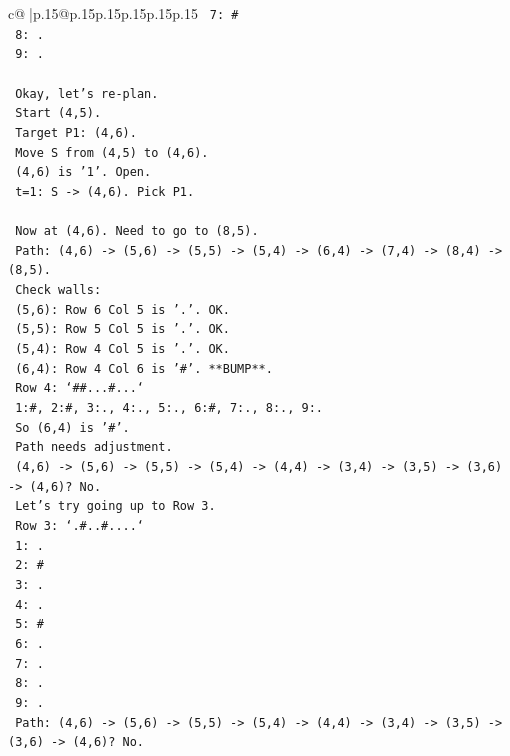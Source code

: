 \documentclass{article}
\begin{document}
{\begin{supertabular}{c@{$\;$}|p{.15\linewidth}@{}p{.15\linewidth}p{.15\linewidth}p{.15\linewidth}p{.15\linewidth}p{.15\linewidth}}
{{{\texttt{   7: \#} \\
\texttt{   8: .} \\
\texttt{   9: .} \\
\\ 
\texttt{   Okay, let's re{-}plan.} \\
\texttt{   Start (4,5).} \\
\texttt{   Target P1: (4,6).} \\
\texttt{   Move S from (4,5) to (4,6).} \\
\texttt{   (4,6) is '1'. Open.} \\
\texttt{   t=1: S {-}> (4,6). Pick P1.} \\
\\ 
\texttt{   Now at (4,6). Need to go to (8,5).} \\
\texttt{   Path: (4,6) {-}> (5,6) {-}> (5,5) {-}> (5,4) {-}> (6,4) {-}> (7,4) {-}> (8,4) {-}> (8,5).} \\
\texttt{   Check walls:} \\
\texttt{   (5,6): Row 6 Col 5 is '.'. OK.} \\
\texttt{   (5,5): Row 5 Col 5 is '.'. OK.} \\
\texttt{   (5,4): Row 4 Col 5 is '.'. OK.} \\
\texttt{   (6,4): Row 4 Col 6 is '\#'. **BUMP**.} \\
\texttt{   Row 4: `\#\#...\#...`} \\
\texttt{   1:\#, 2:\#, 3:., 4:., 5:., 6:\#, 7:., 8:., 9:.} \\
\texttt{   So (6,4) is '\#'.} \\
\texttt{   Path needs adjustment.} \\
\texttt{   (4,6) {-}> (5,6) {-}> (5,5) {-}> (5,4) {-}> (4,4) {-}> (3,4) {-}> (3,5) {-}> (3,6) {-}> (4,6)? No.} \\
\texttt{   Let's try going up to Row 3.} \\
\texttt{   Row 3: `.\#..\#....`} \\
\texttt{   1: .} \\
\texttt{   2: \#} \\
\texttt{   3: .} \\
\texttt{   4: .} \\
\texttt{   5: \#} \\
\texttt{   6: .} \\
\texttt{   7: .} \\
\texttt{   8: .} \\
\texttt{   9: .} \\
\texttt{   Path: (4,6) {-}> (5,6) {-}> (5,5) {-}> (5,4) {-}> (4,4) {-}> (3,4) {-}> (3,5) {-}> (3,6) {-}> (4,6)? No.} \\
}}}
\end{supertabular}}
\end{document}
